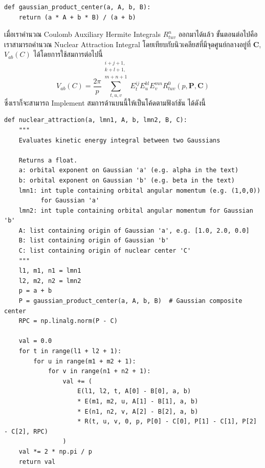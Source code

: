 \begin{lstlisting}[style=MyPython]
def gaussian_product_center(a, A, b, B):
    return (a * A + b * B) / (a + b)
\end{lstlisting}

\vspace{5pt}

เมื่อเราคำนวณ Coulomb Auxiliary Hermite Integrals $R^{n}_{tuv}$ ออกมาได้แล้ว ขั้นตอนต่อไปคือเราสามารถคำนวณ Nuclear Attraction Integral โดยเทียบกับนิวเคลียสที่มีจุดศูนย์กลางอยู่ที่ $\mathbf{C}$, $V_{ab}(C)$ ได้โดยการใช้สมการต่อไปนี้
%
\begin{equation}
  V_{ab}(C)
  =
  \frac{2\pi}{p}
  \sum\limits_{t,u,v}^{\substack{i+j+1,\\k+l+1,\\m+n+1}}
  E_t^{ij} E_u^{kl} E_v^{mn} R^0_{tuv}(p,\mathbf{P},\mathbf{C})
\end{equation}
%
ซึ่งเราก็จะสามารถ Implement สมการด้านบนนี้ให้เป็นโค้ดตามฟังก์ชัน  ได้ดังนี้

\vspace{5pt}

\begin{lstlisting}[style=MyPython]
def nuclear_attraction(a, lmn1, A, b, lmn2, B, C):
    """
    Evaluates kinetic energy integral between two Gaussians

    Returns a float.
    a: orbital exponent on Gaussian 'a' (e.g. alpha in the text)
    b: orbital exponent on Gaussian 'b' (e.g. beta in the text)
    lmn1: int tuple containing orbital angular momentum (e.g. (1,0,0))
          for Gaussian 'a'
    lmn2: int tuple containing orbital angular momentum for Gaussian 'b'
    A: list containing origin of Gaussian 'a', e.g. [1.0, 2.0, 0.0]
    B: list containing origin of Gaussian 'b'
    C: list containing origin of nuclear center 'C'
    """
    l1, m1, n1 = lmn1
    l2, m2, n2 = lmn2
    p = a + b
    P = gaussian_product_center(a, A, b, B)  # Gaussian composite center
    RPC = np.linalg.norm(P - C)

    val = 0.0
    for t in range(l1 + l2 + 1):
        for u in range(m1 + m2 + 1):
            for v in range(n1 + n2 + 1):
                val += (
                    E(l1, l2, t, A[0] - B[0], a, b)
                    * E(m1, m2, u, A[1] - B[1], a, b)
                    * E(n1, n2, v, A[2] - B[2], a, b)
                    * R(t, u, v, 0, p, P[0] - C[0], P[1] - C[1], P[2] - C[2], RPC)
                )
    val *= 2 * np.pi / p
    return val
\end{lstlisting}

